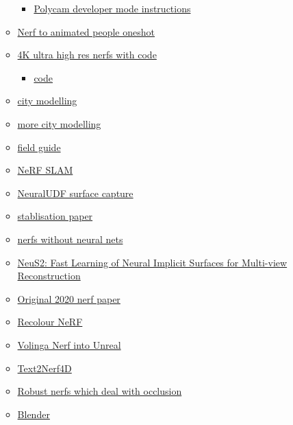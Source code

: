 \begin{itemize}
\begin{itemize}
\begin{itemize}
    \item
      \href{https://docs.nerf.studio/en/latest/quickstart/custom_dataset.html\#polycam-capture}{Polycam
      developer mode instructions}
    \end{itemize}
  \item
    \href{https://elicit3d.github.io/}{Nerf to animated people oneshot}
  \item
    \href{https://paperswithcode.com/paper/4k-nerf-high-fidelity-neural-radiance-fields}{4K
    ultra high res nerfs with code}

\begin{itemize}
     
    \item
      \href{https://github.com/frozoul/4K-NeRF}{code}
    \end{itemize}
  \item
    \href{https://www.reddit.com/r/deeplearning/comments/zowgqn/neural_rendering_reconstruct_your_city_in_3d/}{city
    modelling}
  \item
    \href{https://waymo.com/research/block-nerf/}{more city modelling}
  \item
    \href{https://github.com/3a1b2c3/seeingSpace/wiki/Hands-on:-Getting-started-and-Nerf-frameworks}{field
    guide}
  \item
    \href{https://github.com/ToniRV/NeRF-SLAM}{NeRF SLAM}
  \item
    \href{https://www.xxlong.site/NeuralUDF/}{NeuralUDF surface capture}
  \item
    \href{https://arxiv.org/abs/2102.06205}{stablisation paper}
  \item
    \href{https://alexyu.net/plenoxels/}{nerfs without neural nets}
  \item
    \href{https://vcai.mpi-inf.mpg.de/projects/NeuS2/}{NeuS2: Fast
    Learning of Neural Implicit Surfaces for Multi-view Reconstruction}
  \item
    \href{https://www.matthewtancik.com/nerf}{Original 2020 nerf paper}
  \item
    \href{https://sites.google.com/view/recolornerf?pli=1}{Recolour
    NeRF}
  \item
    \href{https://volinga.ai/}{Volinga Nerf into Unreal}
  \item
    \href{https://make-a-video3d.github.io/}{Text2Nerf4D}
  \item
    \href{https://robustnerf.github.io/public/}{Robust nerfs which deal
    with occlusion}
  \item
    \href{https://github.com/JamesPerlman/NeRFRenderCore/blob/main/src/integrations/blender.cuh}{Blender
}
\end{itemize}
\end{itemize}
